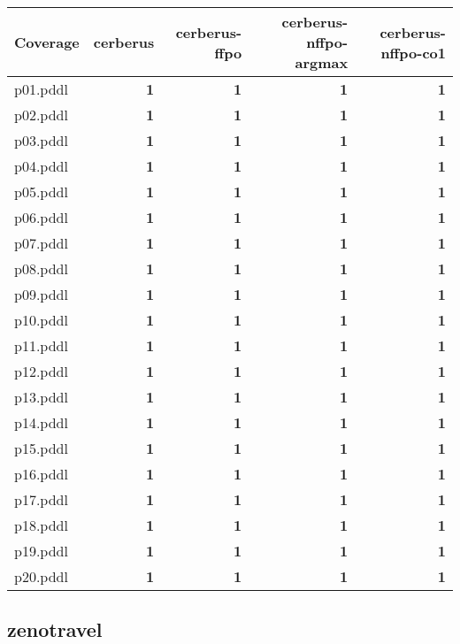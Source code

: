 \documentclass{article}
\begin{document}
\begin{tabular}{@{}lrrrr@{}}
Coverage & cerberus & cerberus-ffpo & cerberus-nffpo-argmax & cerberus-nffpo-co1 \\
\midrule
p01.pddl & \textbf{1} & \textbf{1} & \textbf{1} & \textbf{1} \\
p02.pddl & \textbf{1} & \textbf{1} & \textbf{1} & \textbf{1} \\
p03.pddl & \textbf{1} & \textbf{1} & \textbf{1} & \textbf{1} \\
p04.pddl & \textbf{1} & \textbf{1} & \textbf{1} & \textbf{1} \\
p05.pddl & \textbf{1} & \textbf{1} & \textbf{1} & \textbf{1} \\
p06.pddl & \textbf{1} & \textbf{1} & \textbf{1} & \textbf{1} \\
p07.pddl & \textbf{1} & \textbf{1} & \textbf{1} & \textbf{1} \\
p08.pddl & \textbf{1} & \textbf{1} & \textbf{1} & \textbf{1} \\
p09.pddl & \textbf{1} & \textbf{1} & \textbf{1} & \textbf{1} \\
p10.pddl & \textbf{1} & \textbf{1} & \textbf{1} & \textbf{1} \\
p11.pddl & \textbf{1} & \textbf{1} & \textbf{1} & \textbf{1} \\
p12.pddl & \textbf{1} & \textbf{1} & \textbf{1} & \textbf{1} \\
p13.pddl & \textbf{1} & \textbf{1} & \textbf{1} & \textbf{1} \\
p14.pddl & \textbf{1} & \textbf{1} & \textbf{1} & \textbf{1} \\
p15.pddl & \textbf{1} & \textbf{1} & \textbf{1} & \textbf{1} \\
p16.pddl & \textbf{1} & \textbf{1} & \textbf{1} & \textbf{1} \\
p17.pddl & \textbf{1} & \textbf{1} & \textbf{1} & \textbf{1} \\
p18.pddl & \textbf{1} & \textbf{1} & \textbf{1} & \textbf{1} \\
p19.pddl & \textbf{1} & \textbf{1} & \textbf{1} & \textbf{1} \\
p20.pddl & \textbf{1} & \textbf{1} & \textbf{1} & \textbf{1} \\
\end{tabular}

\hypertarget{coverage-zenotravel}{}
\subsection*{zenotravel}
\end{document}
